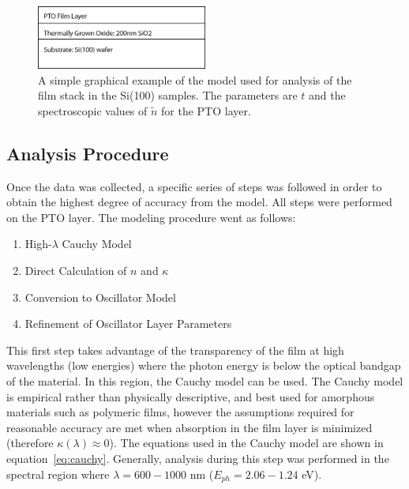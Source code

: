 \begin{figure}[tb]
   \centering
   \includegraphics[width=0.5\textwidth]{./figures/DataAnalysis/ellipsometry-model}
   \caption[Graphical Schematic of VASE Model]{A simple graphical example of the model used for %
   					analysis of the film stack in the Si(100) samples. The parameters %
					are $t$ and the spectroscopic values of $\tilde{n}$ for the PTO layer.}
   \label{fig:Si(100)-model}
\end{figure}


\subsection{Analysis Procedure}

Once the data was collected, a specific series of steps was followed in order to obtain the highest degree of accuracy from the model. All steps were performed on the PTO layer. The modeling procedure went as follows:

\begin{enumerate}
\item
High-$\lambda$ Cauchy Model
\item
Direct Calculation of $n$ and $\kappa$
\item
Conversion to Oscillator Model
\item
Refinement of Oscillator Layer Parameters
\end{enumerate}

This first step takes advantage of the transparency of the film at high wavelengths (low energies) where the photon energy is below the optical bandgap of the material. In this region, the Cauchy model can be used. The Cauchy model is empirical rather than physically descriptive, and best used for amorphous materials such as polymeric films, however the assumptions required for reasonable accuracy are met when absorption in the film layer is minimized (therefore $\kappa(\lambda)\approx0$). The equations used in the Cauchy model are shown in equation~\vref{eq:cauchy}. Generally, analysis during this step was performed in the spectral region where $\lambda = 600-1000$ nm ($E_{ph} = 2.06-1.24$ eV). 

